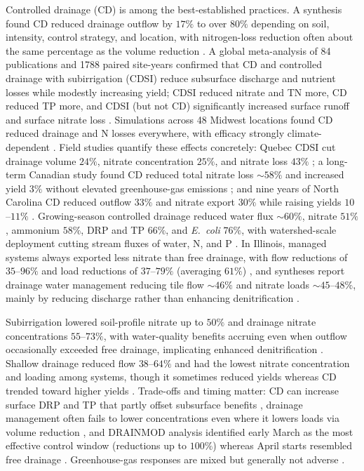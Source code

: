 Controlled drainage (CD) is among the best-established practices. A synthesis
found CD reduced drainage outflow by $17\%$ to over $80\%$ depending on soil,
intensity, control strategy, and location, with nitrogen-loss reduction
often about the same percentage as the volume reduction
\parencite{Skaggs2010}. A global meta-analysis of 84 publications and 1788
paired site-years confirmed that CD and controlled drainage with
subirrigation (CDSI) reduce subsurface discharge and nutrient losses while
modestly increasing yield; CDSI reduced nitrate and TN more, CD reduced TP
more, and CDSI (but not CD) significantly increased surface runoff and
surface nitrate loss \parencite{Wu2025}. Simulations across 48 Midwest
locations found CD reduced drainage and N losses everywhere, with efficacy
strongly climate-dependent \parencite{Youssef2018}. Field studies quantify
these effects concretely: Quebec CDSI cut drainage volume $24\%$, nitrate
concentration $25\%$, and nitrate loss $43\%$ \parencite{Ng2000}; a long-term
Canadian study found CD reduced total nitrate loss $\sim58\%$ and increased
yield $3\%$ without elevated greenhouse-gas emissions
\parencite{Madramootoo2024}; and nine years of North Carolina CD reduced
outflow $33\%$ and nitrate export $30\%$ while raising yields $10$--$11\%$
\parencite{Poole2018}. Growing-season controlled drainage reduced water flux
$\sim60\%$, nitrate $51\%$, ammonium $58\%$, DRP and TP $66\%$, and
\emph{E.\ coli} $76\%$, with watershed-scale deployment cutting stream fluxes
of water, N, and P \parencite{Sunohara2016,Sunohara2015}. In Illinois, managed
systems always exported less nitrate than free drainage, with flow reductions
of $35$--$96\%$ and load reductions of $37$--$79\%$ (averaging $61\%$)
\parencite{Cooke2012}, and syntheses report drainage water management reducing
tile flow $\sim46\%$ and nitrate loads $\sim45$--$48\%$, mainly by reducing
discharge rather than enhancing denitrification
\parencite{Ross2016,Ward2018}.

Subirrigation lowered soil-profile nitrate up to $50\%$ and drainage nitrate
concentrations $55$--$73\%$, with water-quality benefits accruing even when
outflow occasionally exceeded free drainage, implicating enhanced
denitrification \parencite{Elmi2004,Elmi2002,Noory2009}. Shallow drainage
reduced flow $38$--$64\%$ and had the lowest nitrate concentration and
loading among systems, though it sometimes reduced yields whereas CD trended
toward higher yields \parencite{Smith2019,Smith2011b}. Trade-offs and timing
matter: CD can increase surface DRP and TP that partly offset subsurface
benefits \parencite{King2022,Wu2025}, drainage management often fails to
lower concentrations even where it lowers loads via volume reduction
\parencite{Grenon2023,Wesström2014}, and DRAINMOD analysis identified early
March as the most effective control window (reductions up to $100\%$) whereas
April starts resembled free drainage \parencite{Kesicka2023c}. Greenhouse-gas
responses are mixed but generally not adverse
\parencite{Madramootoo2024,Smith2019}.

